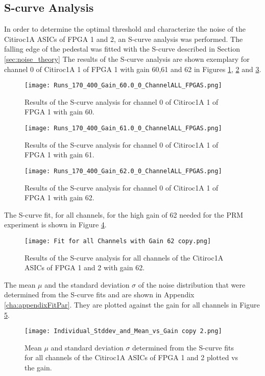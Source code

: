\subsection{S-curve Analysis}
In order to determine the optimal threshold and characterize the noise of the Citiroc1A ASICs of FPGA 1 and 2, an S-curve analysis was performed.
\newline
The falling edge of the pedestal was fitted with the S-curve described in Section \ref{sec:noise_theory}
\newline
The results of the S-curve analysis are shown exemplary for channel 0 of Citiroc1A 1 of FPGA 1 with gain 60,61 and 62 in Figures \ref{fig:S_curve_60}, \ref{fig:S_curve_61} and \ref{fig:S_curve_62}.

\begin{figure}[H]
    \centering
    \texttt{[image: Runs\_170\_400\_Gain\_60.0\_0\_ChannelALL\_FPGAS.png]}
    \caption{Results of the S-curve analysis for channel 0 of Citiroc1A 1 of FPGA 1 with gain 60.}
    \label{fig:S_curve_60}
\end{figure}
\begin{figure}[H]
    \centering
    \texttt{[image: Runs\_170\_400\_Gain\_61.0\_0\_ChannelALL\_FPGAS.png]}
    \caption{Results of the S-curve analysis for channel 0 of Citiroc1A 1 of FPGA 1 with gain 61.}
    \label{fig:S_curve_61}
\end{figure}
\begin{figure}[H]
    \centering
    \texttt{[image: Runs\_170\_400\_Gain\_62.0\_0\_ChannelALL\_FPGAS.png]}
    \caption{Results of the S-curve analysis for channel 0 of Citiroc1A 1 of FPGA 1 with gain 62.}
    \label{fig:S_curve_62}
\end{figure}
The S-curve fit, for all channels, for the high gain of 62 needed for the PRM experiment is shown in Figure \ref{fig:S_curve_62_ALL}. 

\begin{figure}[H]
    \centering
    \texttt{[image: Fit for all Channels with Gain 62 copy.png]}
    \caption{Results of the S-curve analysis for all channels of the Citiroc1A ASICs of FPGA 1 and 2 with gain 62.}
    \label{fig:S_curve_62_ALL}
\end{figure}
The mean $\mu$ and the standard deviation $\sigma$ of the noise distribution that were determined from the S-curve fits and are shown in Appendix \ref{cha:appendixFitPar}.
They are plotted against the gain for all channels in Figure \ref{fig:Mean vs gain}.
\begin{figure}[H]
    \centering
    \texttt{[image: Individual\_Stddev\_and\_Mean\_vs\_Gain copy 2.png]}
    \caption{Mean $\mu$ and standard deviation $\sigma$ determined from the S-curve fits for all channels of the Citiroc1A ASICs of FPGA 1 and 2 plotted vs the gain.}
    \label{fig:Mean vs gain}
\end{figure}

